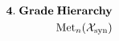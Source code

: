 \documentclass[preview]{standalone}
\begin{document}
\begin{align*}
\special{dvisvgm:raw <g id='unique000'>}\mathbf{4.\;Grade\;Hierarchy}\\\operatorname{Met}_n(\mathcal{X}_{\text{syn}})\special{dvisvgm:raw </g>}
\end{align*}
\end{document}
